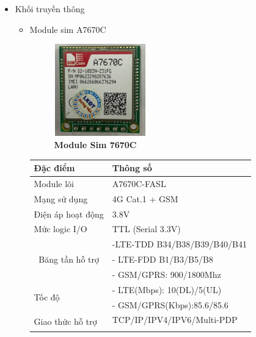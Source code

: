 \documentclass{article} %
\begin{document}
\begin{itemize}
\begin{itemize}[label=$\ast$]
		\end{itemize}
		\item Khối truyền thông
		\begin{itemize}[label=$\ast$]
			\item Module sim A7670C
			\begin{figure}[!ht]
				\centering
				\includegraphics[width=4cm,height=4cm]{Images/A7670C.png}
				\caption[Module Sim 7670C\cite{a7670c}]{\bfseries \fontsize{12pt}{0pt}\selectfont Module Sim 7670C\cite{a7670c}}
				\label{A7670C}
			\end{figure}
			\begin{table}[H]
				\centering
				\begin{tabular}{|l|l|}
					\hline
					Đặc điểm                                               & Thông số                     \\ \hline
					Module lõi                                             & A7670C-FASL                  \\ \hline
					Mạng sử dụng                                           & 4G Cat.1 + GSM               \\ \hline
					Điện áp hoạt động                                      & 3.8V                         \\ \hline
					Mức logic I/O                                          & TTL (Serial 3.3V)            \\ \hline
					\multicolumn{1}{|c|}{\multirow{3}{*}{Băng tần hỗ trợ}} & -LTE-TDD B34/B38/B39/B40/B41 \\ \cline{2-2} 
					\multicolumn{1}{|c|}{}                                 & - LTE-FDD B1/B3/B5/B8        \\ \cline{2-2} 
					\multicolumn{1}{|c|}{}                                 & - GSM/GPRS: 900/1800Mhz      \\ \hline
					\multirow{2}{*}{Tốc độ}                                & - LTE(Mbps): 10(DL)/5(UL)    \\ \cline{2-2} 
					& - GSM/GPRS(Kbps):85.6/85.6   \\ \hline
					\multirow{2}{*}{Giao thức hỗ trợ}                      & TCP/IP/IPV4/IPV6/Multi-PDP   \\ \cline{2-2} 

\end{tabular}
\end{table}
\end{itemize}
\end{itemize}
\end{document}
